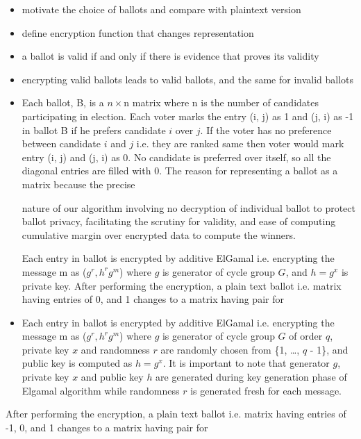 \documentclass{llncs}
\begin{document}
\begin{itemize}
  \item motivate the choice of ballots and compare with plaintext
  version
  \item define encryption function that changes representation
  \item a ballot is valid if and only if there is evidence that
  proves its validity
  \item encrypting valid ballots leads to valid ballots, and the
  same for invalid ballots 
  
  \item Each ballot, B, is a $n\times$n matrix where n is the number of 
  candidates participating in election. Each voter marks the entry (i, j) as 1 
  and (j, i) as -1 in ballot B if  he prefers candidate $i$ over $j$. If the voter 
  has no preference between candidate $i$ and $j $ i.e. they are ranked 
  same then voter would mark entry (i, j) and (j, i) as 0. No candidate is 
  preferred over itself, so all the diagonal entries are  filled with 0.  The
   reason for representing a ballot as a matrix because the precise 

  nature of our algorithm involving no decryption of individual ballot to protect
  ballot privacy,  facilitating the scrutiny for validity, and ease of computing 
  cumulative margin over encrypted data to compute the winners. 
  
  
   

  Each entry in ballot is encrypted by additive ElGamal i.e. encrypting the 
  message m as ($g^{r}, h^{r}g^{m}$) where $g$ is generator of cycle group $G$, and 
  $h = g^{x}$ is private key. After performing the encryption, a plain text ballot 
  i.e. matrix having entries of 0, and 1 changes to a matrix having pair for 

  \item  Each entry in ballot is encrypted by additive ElGamal i.e. encrypting the 
  message m as ($g^{r}, h^{r}g^{m}$) where $g$ is generator of cycle group $G$ of order $q$,  private key $x$ and randomness $r$  are randomly  
  chosen from \{1, \ldots, $q$ - 1\}, and public key is computed as 
  $h = g^{x}$. It is important to note that generator $g$, private key $x$ and 
  public key $h$ are generated during key generation phase of Elgamal 
  algorithm while  randomness $r$  is generated fresh for each message.
 \end{itemize} 
  After performing the encryption, a plain text ballot 
  i.e. matrix having entries of -1,  0, and 1 changes to a matrix having pair for 
\end{document}
